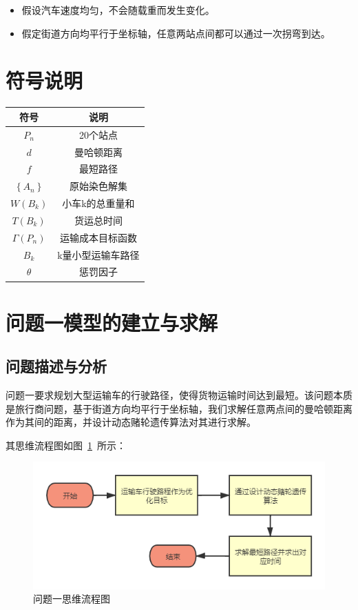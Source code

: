 \documentclass{whutmod}
\begin{document}
	\begin{itemize}                                             
		\item [(1)] 假设汽车速度均匀，不会随载重而发生变化。
		\item [(2)] 假定街道方向均平行于坐标轴，任意两站点间都可以通过一次拐弯到达。
	\end{itemize}
		
	\section{符号说明}
	\begin{table}[H]
	\label{biao} \centering
	\begin{tabular}{cc}
		\toprule[1.5pt]
		\multicolumn{1}{m{5cm}}{\centering 符号} & \multicolumn{1}{m{5cm}}{\centering 说明} \\
		\midrule[0.5pt]		
		$P_n$  & 20个站点  \\ 
		$d$  &  曼哈顿距离 \\ 
		$f$  &  最短路径\\
		$\left \{ A_n \right \}$  &  原始染色解集\\
				$W(B_k)$  & 小车k的总重量和\\
						$T(B_k)$  & 货运总时间\\
		$\Gamma (P_n)$  & 运输成本目标函数\\
		$B_k$  & k量小型运输车路径\\
		$\theta$&惩罚因子\\
		\bottomrule[1.5pt]
	\end{tabular}
\end{table}

	\section{问题一模型的建立与求解}
    \subsection{问题描述与分析}
问题一要求规划大型运输车的行驶路径，使得货物运输时间达到最短。该问题本质是旅行商问题，基于街道方向均平行于坐标轴，我们求解任意两点间的曼哈顿距离作为其间的距离，并设计动态赌轮遗传算法对其进行求解。


    其思维流程图如图~\ref{lct}~所示：

       \begin{figure}[H]
	   	\centering
	   	\includegraphics[width=\textwidth]{figures/abab.png}
	   	\caption{问题一思维流程图}\label{lct}
	   \end{figure}
\end{document}
